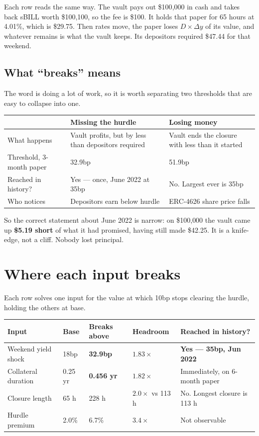 \documentclass[11pt,a4paper]{article}
\begin{document}
Each row reads the same way. The vault pays out \$100{,}000 in cash and takes back sBILL
worth \$100{,}100, so the fee is \$100. It holds that paper for 65 hours at 4.01\%, which
is \$29.75. Then rates move, the paper loses $D\times\Delta y$ of its value, and whatever
remains is what the vault keeps. Its depositors required \$47.44 for that weekend.

\subsection{What ``breaks'' means}

The word is doing a lot of work, so it is worth separating two thresholds that are easy to
collapse into one.

\begin{center}
\small
\begin{tabular}{@{}p{4.2cm}p{5.2cm}p{5.6cm}@{}}
\toprule
& \textbf{Missing the hurdle} & \textbf{Losing money} \\
\midrule
What happens & Vault profits, but by less than depositors required & Vault ends the closure with less than it started \\
Threshold, 3-month paper & 32.9bp & 51.9bp \\
Reached in history? & Yes — once, June 2022 at 35bp & No. Largest ever is 35bp \\
Who notices & Depositors earn below hurdle & ERC-4626 share price falls \\
\bottomrule
\end{tabular}
\end{center}

So the correct statement about June 2022 is narrow: on \$100{,}000 the vault came up
\textbf{\$5.19 short} of what it had promised, having still made \$42.25. It is a
knife-edge, not a cliff. Nobody lost principal.

\section{Where each input breaks}
\label{sec:breaks}

Each row solves one input for the value at which 10bp stops clearing the hurdle, holding
the others at base.

\begin{center}
\small
\begin{tabular}{@{}p{4.0cm}p{2.0cm}p{2.4cm}p{2.0cm}p{3.6cm}@{}}
\toprule
\textbf{Input} & \textbf{Base} & \textbf{Breaks above} & \textbf{Headroom} & \textbf{Reached in history?} \\
\midrule
Weekend yield shock & 18bp & \textbf{32.9bp} & $1.83\times$ & \textbf{Yes — 35bp, Jun 2022} \\
Collateral duration & 0.25 yr & \textbf{0.456 yr} & $1.82\times$ & Immediately, on 6-month paper \\
Closure length & 65 h & 228 h & $2.0\times$ vs 113 h & No. Longest closure is 113 h \\
Hurdle premium & 2.0\% & 6.7\% & $3.4\times$ & Not observable \\
\bottomrule
\end{tabular}
\end{center}
\end{document}
